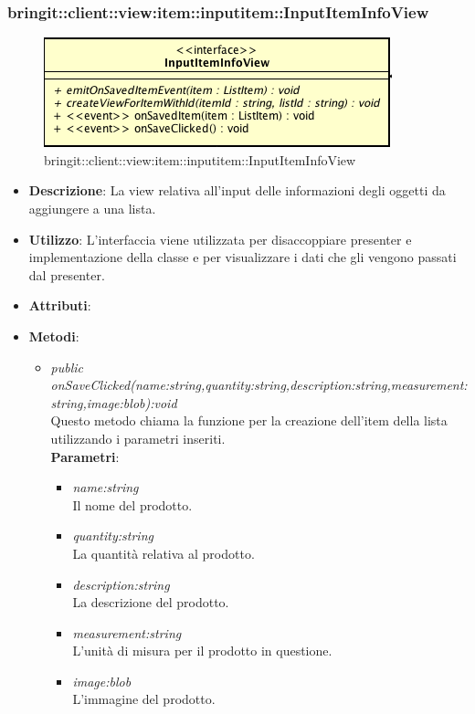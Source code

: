 \subsubsection{bringit::client::view:item::inputitem::InputItemInfoView}

\label{bringit::client::view:item::inputitem::InputItemInfoView}
\begin{figure}[H]
	\centering
	\includegraphics[scale=0.5]{Sezioni/SottosezioniST/img/app/InputItemInfoView.png}
	\caption{bringit::client::view:item::inputitem::InputItemInfoView}
\end{figure}

\begin{itemize}
\item \textbf{Descrizione}: La view relativa all'input delle informazioni degli oggetti da aggiungere a una lista.
\item \textbf{Utilizzo}: L'interfaccia viene utilizzata per disaccoppiare presenter e implementazione della classe e per visualizzare i dati che gli vengono passati dal presenter.
\item \textbf{Attributi}: 
\item \textbf{Metodi}:
	\begin{itemize}
	\item \textit{public onSaveClicked(name:string,quantity:string,description:string,measurement:string,image:blob):void}\\
	Questo metodo chiama la funzione per la creazione dell'item della lista utilizzando i parametri inseriti.
				\\ \textbf{Parametri}: \begin{itemize}
			\item \textit{name:string}\\
			Il nome del prodotto.
			\item \textit{quantity:string}\\
			La quantità relativa al prodotto.
			\item \textit{description:string}\\
			La descrizione del prodotto.
			\item \textit{measurement:string}\\
			L'unità di misura per il prodotto in questione.
			\item \textit{image:blob}\\
			L'immagine del prodotto.
					\end{itemize} 
	\end{itemize}
\end{itemize} 

